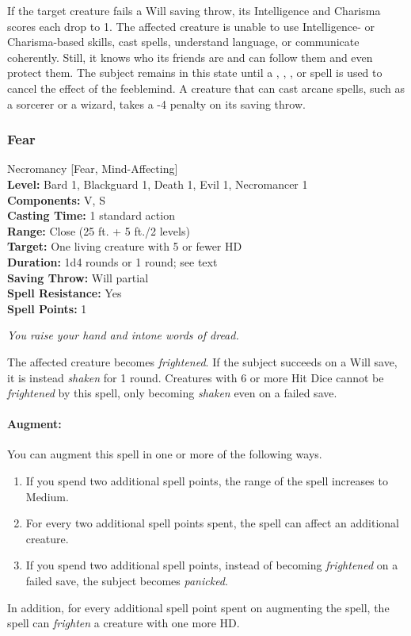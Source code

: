 If the target creature fails a Will saving throw, its Intelligence and Charisma scores each drop to 1. 
The affected creature is unable to use Intelligence- or Charisma-based skills, cast spells, understand language, or communicate coherently. 
Still, it knows who its friends are and can follow them and even protect them. 
The subject remains in this state until a ,  , 
, or  spell is used to cancel the effect of the feeblemind. 
A creature that can cast arcane spells, such as a sorcerer or a wizard, takes a -4 penalty on its saving throw.

\subsubsection{Fear}
\label{Spell:Fear}
Necromancy [Fear, Mind-Affecting]
\\ \textbf{Level:} Bard 1, Blackguard 1, Death 1, Evil 1, Necromancer 1
\\ \textbf{Components:} V, S
\\ \textbf{Casting Time:} 1 standard action
\\ \textbf{Range:} Close (25 ft. + 5 ft./2 levels)
\\ \textbf{Target:} One living creature with 5 or fewer HD
\\ \textbf{Duration:} 1d4 rounds or 1 round; see text
\\ \textbf{Saving Throw:} Will partial
\\ \textbf{Spell Resistance:} Yes
\\ \textbf{Spell Points:} 1

\emph{You raise your hand and intone words of dread.}

The affected creature becomes \emph{frightened}. 
If the subject succeeds on a Will save, it is instead \emph{shaken} for 1 round. 
Creatures with 6 or more Hit Dice cannot be \emph{frightened} by this spell, only becoming \emph{shaken} even on a failed save.

\paragraph{Augment:} You can augment this spell in one or more of the following ways.
\begin{enumerate}
\item If you spend two additional spell points, the range of the spell increases to Medium.
\item For every two additional spell points spent, the spell can affect an additional creature.
\item If you spend two additional spell points, instead of becoming \emph{frightened} on a failed save, the subject becomes \emph{panicked}.
\end{enumerate}
In addition, for every additional spell point spent on augmenting the spell, the spell can \emph{frighten} a creature with one more HD.
